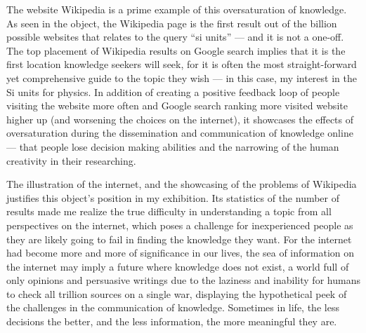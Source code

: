 \documentclass[a4paper,11pt]{article}
\begin{document}
The website Wikipedia is a prime example of this oversaturation of knowledge. As seen in the object, the Wikipedia page is the first result out of the billion possible websites that relates to the query ``si units'' --- and it is not a one-off. The top placement of Wikipedia results on Google search implies that it is the first location knowledge seekers will seek, for it is often the most straight-forward yet comprehensive guide to the topic they wish --- in this case, my interest in the Si units for physics. In addition of creating a positive feedback loop of people visiting the website more often and Google search ranking more visited website higher up (and worsening the choices on the internet), it showcases the effects of oversaturation during the dissemination and communication of knowledge online --- that people lose decision making abilities and the narrowing of the human creativity in their researching.

The illustration of the internet, and the showcasing of the problems of Wikipedia justifies this object's position in my exhibition. Its statistics of the number of results made me realize the true difficulty in understanding a topic from all perspectives on the internet, which poses a challenge for inexperienced people as they are likely going to fail in finding the knowledge they want. For the internet had become more and more of significance in our lives, the sea of information on the internet may imply a future where knowledge does not exist, a world full of only opinions and persuasive writings due to the laziness and inability for humans to check all trillion sources on a single war, displaying the hypothetical peek of the challenges in the communication of knowledge. Sometimes in life, the less decisions the better, and the less information, the more meaningful they are.


\end{document}
